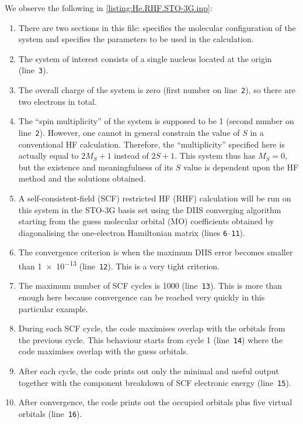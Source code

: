 		We observe the following in \cref{listing:He.RHF.STO-3G.inp}:
			\begin{enumerate}
				\item There are two sections in this file:  specifies the molecular configuration of the system and  specifies the parameters to be used in the calculation.
				\item The system of interest consists of a single  nucleus located at the origin (line~\texttt{3}).
				\item The overall charge of the system is zero (first number on line~\texttt{2}), so there are two electrons in total.
				\item The ``spin multiplicity'' of the system is supposed to be \SI{1}{} (second number on line~\texttt{2}).
				However, one cannot in general constrain the value of $S$ in a conventional HF calculation.
				Therefore, the ``multiplicity'' specified here is actually equal to $2M_S + 1$ instead of $2S + 1$.
				This system thus has $M_S = 0$, but the existence and meaningfulness of its $S$ value is dependent upon the HF method and the solutions obtained.
				\item A self-consistent-field (SCF) restricted HF (RHF) calculation will be run on this system in the STO-3G basis set using the DIIS converging algorithm starting from the guess molecular orbital (MO) coefficients obtained by diagonalising the one-electron Hamiltonian matrix (lines \texttt{6}--\texttt{11}).
				\item The convergence criterion is when the maximum DIIS error becomes smaller than \SI{1e-13}{} (line~\texttt{12}). This is a very tight criterion.
				\item The maximum number of SCF cycles is \SI{1000}{} (line~\texttt{13}). This is more than enough here because convergence can be reached very quickly in this particular example.
				\item During each SCF cycle, the code maximises overlap with the orbitals from the previous cycle. This behaviour starts from cycle 1 (line~\texttt{14}) where the code maximises overlap with the guess orbitals.
				\item After each cycle, the code prints out only the minimal and useful output together with the component breakdown of SCF electronic energy (line~\texttt{15}).
				\item After convergence, the code prints out the occupied orbitals plus five virtual orbitals (line~\texttt{16}).
			\end{enumerate}
	
